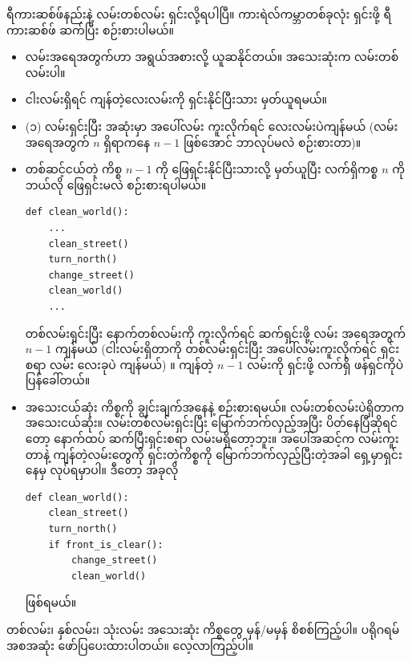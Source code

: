 ရီကားဆစ်ဖ်နည်းနဲ့ လမ်းတစ်လမ်း ရှင်းလို့ရပါပြီ။ ကားရဲလ်ကမ္ဘာတစ်ခုလုံး ရှင်းဖို့ ရီကားဆစ်ဖ် ဆက်ပြီး စဉ်းစားပါမယ်။ 
%
\begin{itemize}
    \item လမ်းအရေအတွက်ဟာ အရွယ်အစားလို့ ယူဆနိုင်တယ်။ အသေးဆုံးက လမ်းတစ်လမ်းပါ။
    \item ငါးလမ်းရှိရင် ကျန်တဲ့လေးလမ်းကို ရှင်းနိုင်ပြီးသား မှတ်ယူရမယ်။
    \item (၁) လမ်းရှင်းပြီး အဆုံးမှာ အပေါ်လမ်း ကူးလိုက်ရင် လေးလမ်းပဲကျန်မယ် (လမ်းအရေအတွက် $n$ ရှိရာကနေ   $n - 1$ ဖြစ်အောင် ဘာလုပ်မလဲ စဉ်းစားတာ)။
    \item တစ်ဆင့်ငယ်တဲ့ ကိစ္စ $n - 1$ ကို ဖြေရှင်းနိုင်ပြီးသားလို့ မှတ်ယူပြီး လက်ရှိကစ္စ $n$ ကို ဘယ်လို ဖြေရှင်းမလဲ စဉ်းစားရပါမယ်။
%
\setlength{\fboxsep}{0pt}
\begin{verbatim}
def clean_world():
    ...
    clean_street()
    turn_north()
    change_street()
    clean_world()
    ...
\end{verbatim}
    တစ်လမ်းရှင်းပြီး နောက်တစ်လမ်းကို ကူးလိုက်ရင် ဆက်ရှင်းဖို့ လမ်း အရေအတွက် $n - 1$ ကျန်မယ် (ငါးလမ်းရှိတာကို တစ်လမ်းရှင်းပြီး အပေါ်လမ်းကူးလိုက်ရင် ရှင်းစရာ လမ်း လေးခုပဲ ကျန်မယ်) ။ ကျန်တဲ့ $n - 1$  လမ်းကို ရှင်းဖို့ လက်ရှိ  ဖန်ရှင်ကိုပဲ ပြန်ခေါ်တယ်။
%
    \item အသေးငယ်ဆုံး ကိစ္စကို ချွင်းချက်အနေနဲ့ စဉ်းစားရမယ်။   လမ်းတစ်လမ်းပဲရှိတာက အသေးငယ်ဆုံး။ လမ်းတစ်လမ်းရှင်းပြီး မြောက်ဘက်လှည့်အပြီး ပိတ်နေပြီဆိုရင်တော့ နောက်ထပ် ဆက်ပြီးရှင်းစရာ လမ်းမရှိတော့ဘူး။ အပေါ်အဆင့်က လမ်းကူးတာနဲ့ ကျန်တဲ့လမ်းတွေကို ရှင်းတဲ့ကိစ္စကို မြောက်ဘက်လှည့်ပြီးတဲ့အခါ ရှေ့မှာရှင်းနေမှ လုပ်ရမှာပါ။ ဒီတော့ အခုလို 
\setlength{\fboxsep}{0pt}
\begin{verbatim}
def clean_world():
    clean_street()
    turn_north()
    if front_is_clear():
        change_street()
        clean_world()
\end{verbatim}
    ဖြစ်ရမယ်။ 
%
\end{itemize}
%
တစ်လမ်း၊ နှစ်လမ်း၊ သုံးလမ်း အသေးဆုံး ကိစ္စတွေ မှန်/မမှန် စိစစ်ကြည့်ပါ။ ပရိုဂရမ် အစအဆုံး ဖော်ပြပေးထားပါတယ်။ လေ့လာကြည့်ပါ။
%
\setlength{\fboxsep}{0pt}
